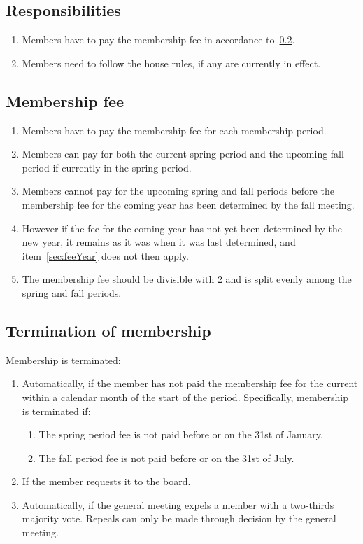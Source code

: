 \subsection{Responsibilities}
\begin{enumerate}
  \item Members have to pay the membership fee in accordance to~\ref{sec:membershipFee}.
  \item Members need to follow the house rules, if any are currently in effect.
\end{enumerate}

\subsection{Membership fee} \label{sec:membershipFee}
\begin{enumerate}
  \item Members have to pay the membership fee for each membership period.
  \item Members can pay for both the current spring period and the upcoming fall period if currently in the spring period.
  \item Members cannot pay for the upcoming spring and fall periods before the membership fee for the coming year has been determined by the fall meeting. \label{sec:feeYear}
  \item However if the fee for the coming year has not yet been determined by the new year, it remains as it was when it was last determined, and item~\ref{sec:feeYear} does not then apply.
  \item The membership fee should be divisible with 2 and is split evenly among the spring and fall periods.
\end{enumerate}

\subsection{Termination of membership} \label{sec:membershipTermination}
Membership is terminated:
\begin{enumerate}
  \item Automatically, if the member has not paid the membership fee for the current within a calendar month of the start of the period. Specifically, membership is terminated if:
  \begin{enumerate}
    \item The spring period fee is not paid before or on the 31st of January.
    \item The fall period fee is not paid before or on the 31st of July.
  \end{enumerate}
  \item If the member requests it to the board.
  \item Automatically, if the general meeting expels a member with a two-thirds majority vote. Repeals can only be made through decision by the general meeting.
\end{enumerate}

